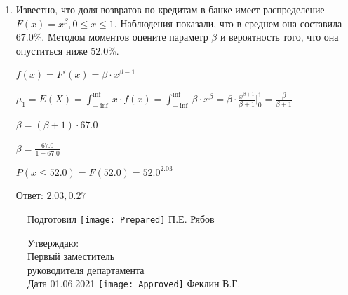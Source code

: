\documentclass[a4paper,14pt]{article}
\begin{document}
\begin{enumerate}
\item

    
	Известно, что доля возвратов по кредитам в банке имеет распределение $F(x) = x^{\beta}, 0 \le x \le 1$. Наблюдения показали, что в среднем она составила $67.0$\%. Методом моментов оцените параметр $\beta$ и вероятность того, что она опуститься ниже $52.0$\%.
	


	

	$f(x) = F'(x) = \beta \cdot x^{\beta - 1}$

	$\mu_{1} = E(X) = \int_{-\inf}^{\inf}x \cdot f(x) = \int_{-\inf}^{\inf} \beta \cdot x^{\beta} = \beta \cdot \frac{x^{\beta + 1}}{\beta + 1}\bigg|_0^1 = \frac{\beta}{\beta + 1}$

	$\beta = (\beta + 1) \cdot 67.0$

	$\beta = \frac{67.0}{1 - 67.0}$

	$ P(x \le 52.0) = F(52.0) = 52.0^{2.03} $

    Ответ: $2.03, 0.27$
	

\end{enumerate}

\begin{figure}[H]
	Подготовил
	\hfill
	\texttt{[image: Prepared]}
	П.Е. Рябов
\end{figure}


\begin{figure}[H]
	Утверждаю:\\
	Первый заместитель\\
	руководителя департамента\\
	Дата 01.06.2021
	\hfill
	\texttt{[image: Approved]}
	Феклин В.Г.
\end{figure}
\end{document}
